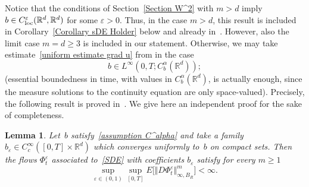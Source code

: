 \documentclass[a4paper,10pt]{article}
\newtheorem{lemma}[theorem]{Lemma}
\newcommand\1{\mathbbm{1}}
\newcommand{\eps}{\varepsilon}
\newcommand\loc{{\rm loc}}
\numberwithin{equation}{section}
\begin{document}
Notice that the conditions of Section~\ref{Section W^2} with $m>d$ imply $b\in C_{\loc}^{\varepsilon}(\mathbb{R}^{d},\mathbb{R}^{d})$ for some $\varepsilon>0$. Thus, in the case $m>d$, this result is included in Corollary~\ref{Corollary sDE Holder} below and already in~\cite{DAVIE07}. However, also the limit case $m=d\geq3$ is included in our statement. Otherwise, we may take estimate~\eqref{uniform estimate grad u} from
\cite{FLAGUBPRI10} in the case
\begin{equation}
b\in L^{\infty}(0,T;C_{b}^{\alpha}(\mathbb{R}^{d}));  \label{assumption C^alpha} 
\end{equation}
(essential boundedness in time, with values in $C_{b}^{\alpha}(\mathbb{R}^{d})$, is actually enough, since the measure solutions to the continuity equation are only space-valued). Precisely, the following result is proved in~\cite{FLAGUBPRI10}. We give here an independent proof for the sake of completeness.

\begin{lemma}
Let~$b$ satisfy~\eqref{assumption C^alpha} and take a family $b_{\eps}\in C_{c}^{\infty}([0,T] \times\mathbb{R}^{d})$ which converges uniformly to~$b$ on compact sets. Then the flows $\Phi^{\eps}_t$ associated to~\eqref{SDE} with coefficients $b_{\eps}$ satisfy for every $m\geq 1$
\begin{equation}
\sup_{\eps\in (0,1)  }\sup_{[0,T]  }E\Big[ \Vert D\Phi^{\eps}_t \Vert_{\infty,B_R
}^{m} \Big]  <\infty .\label{flow estimate} 
\end{equation}
\end{lemma}
\end{document}
